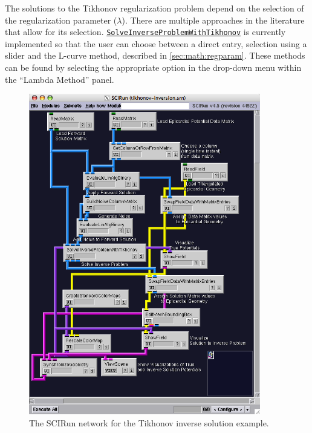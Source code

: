     
    
    The solutions to the Tikhonov regularization problem depend on the selection of the regularization parameter ($\lambda$).
    There are multiple approaches in the literature that allow for its selection.
    \href{http://scirundocwiki.sci.utah.edu/SCIRunDocs/index.php/CIBC:Documentation:SCIRun:Reference:BioPSE:SolveInverseProblemWithTikhonov}{{\tt SolveInverseProblemWithTikhonov}} is currently implemented so that the user can choose between a direct entry, selection using a slider and the L-curve method, described in \autoref{sec:math:regparam}.
    These methods can be found by selecting the appropriate option in the drop-down menu within the ``Lambda Method'' panel.
    
    
    \begin{figure}
        \begin{center}
        \includegraphics[width=0.9\textwidth]{ECGToolkitGuide_figures/TikhonovNetwork.png}
        \caption{The SCIRun network for the Tikhonov inverse solution example.}
        \label{TikhonovNetworkExample}
        \end{center}
    \end{figure}
    


